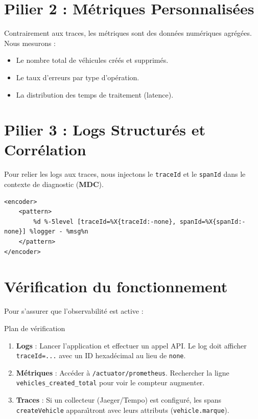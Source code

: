 \documentclass[12pt,a4paper]{report}
\begin{document}
\section{Pilier 2 : M\'etriques Personnalis\'ees}

Contrairement aux traces, les m\'etriques sont des donn\'ees num\'eriques agr\'eg\'ees. Nous mesurons :
\begin{itemize}
    \item Le nombre total de v\'ehicules cr\'e\'es et supprim\'es.
    \item Le taux d'erreurs par type d'op\'eration.
    \item La distribution des temps de traitement (latence).
\end{itemize}

\section{Pilier 3 : Logs Structur\'es et Corr\'elation}

Pour relier les logs aux traces, nous injectons le \texttt{traceId} et le \texttt{spanId} dans le contexte de diagnostic (\textbf{MDC}).

\begin{lstlisting}[style=xmlstyle, caption={Configuration Logback (logback-spring.xml)}]
<encoder>
    <pattern>
        %d %-5level [traceId=%X{traceId:-none}, spanId=%X{spanId:-none}] %logger - %msg%n
    </pattern>
</encoder>
\end{lstlisting}

\section{V\'erification du fonctionnement}

Pour s'assurer que l'observabilit\'e est active :

\begin{adrbox}{Plan de v\'erification}
\begin{enumerate}
    \item \textbf{Logs} : Lancer l'application et effectuer un appel API. Le log doit afficher \texttt{traceId=...} avec un ID hexad\'ecimal au lieu de \texttt{none}.
    \item \textbf{M\'etriques} : Acc\'eder \`a \texttt{/actuator/prometheus}. Rechercher la ligne \texttt{vehicles\_created\_total} pour voir le compteur augmenter.
    \item \textbf{Traces} : Si un collecteur (Jaeger/Tempo) est configur\'e, les spans \texttt{createVehicle} appara\^\i tront avec leurs attributs (\texttt{vehicle.marque}).
\end{enumerate}
\end{adrbox}
\end{document}
